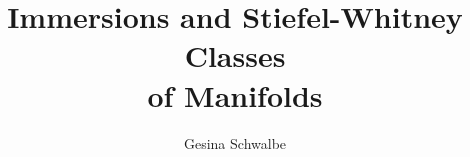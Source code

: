 \documentclass[
a4paper, english, oneside, BCOR=3mm,
bibliography=totoc, abstract=true,
]{scrreprt}
\title{Immersions and Stiefel-Whitney Classes\\of Manifolds}
\author{Gesina Schwalbe}
\date{\handindate}
\begin{document}
\maketitle



\tableofcontents













\nocite{*}
\printbibliography



\end{document}
